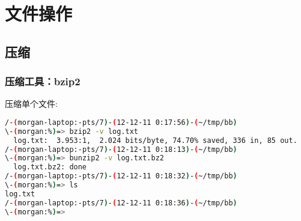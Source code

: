 
\chapter{文件操作}

\section{压缩}

\subsection{压缩工具：bzip2}

压缩单个文件:

\begin{lstlisting}[language=Bash]
/-(morgan-laptop:-pts/7)-(12-12-11 0:17:56)-(~/tmp/bb)
\-(morgan:%)=> bzip2 -v log.txt 
  log.txt:  3.953:1,  2.024 bits/byte, 74.70% saved, 336 in, 85 out.
/-(morgan-laptop:-pts/7)-(12-12-11 0:18:13)-(~/tmp/bb)
\-(morgan:%)=> bunzip2 -v log.txt.bz2 
  log.txt.bz2: done
/-(morgan-laptop:-pts/7)-(12-12-11 0:18:32)-(~/tmp/bb)
\-(morgan:%)=> ls
log.txt
/-(morgan-laptop:-pts/7)-(12-12-11 0:18:36)-(~/tmp/bb)
\-(morgan:%)=> 
\end{lstlisting}

% 



